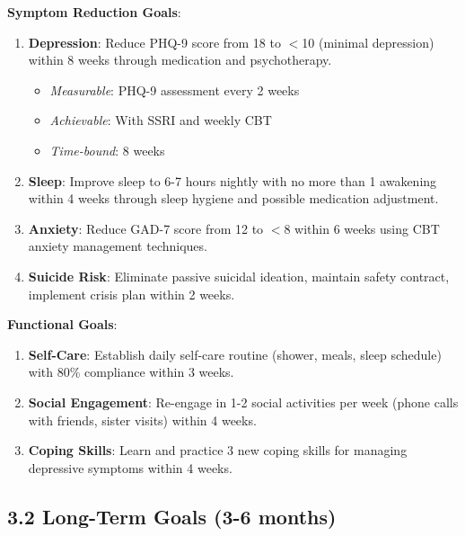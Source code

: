\documentclass[11pt,letterpaper]{article}
\begin{document}
\textbf{Symptom Reduction Goals}:
\begin{enumerate}[leftmargin=*]
    \item \textbf{Depression}: Reduce PHQ-9 score from 18 to $<$10 (minimal depression) within 8 weeks through medication and psychotherapy.
    \begin{itemize}
        \item \textit{Measurable}: PHQ-9 assessment every 2 weeks
        \item \textit{Achievable}: With SSRI and weekly CBT
        \item \textit{Time-bound}: 8 weeks
    \end{itemize}
    
    \item \textbf{Sleep}: Improve sleep to 6-7 hours nightly with no more than 1 awakening within 4 weeks through sleep hygiene and possible medication adjustment.
    
    \item \textbf{Anxiety}: Reduce GAD-7 score from 12 to $<$8 within 6 weeks using CBT anxiety management techniques.
    
    \item \textbf{Suicide Risk}: Eliminate passive suicidal ideation, maintain safety contract, implement crisis plan within 2 weeks.
\end{enumerate}

\textbf{Functional Goals}:
\begin{enumerate}[leftmargin=*]
    \item \textbf{Self-Care}: Establish daily self-care routine (shower, meals, sleep schedule) with 80\% compliance within 3 weeks.
    
    \item \textbf{Social Engagement}: Re-engage in 1-2 social activities per week (phone calls with friends, sister visits) within 4 weeks.
    
    \item \textbf{Coping Skills}: Learn and practice 3 new coping skills for managing depressive symptoms within 4 weeks.
\end{enumerate}

\subsection*{3.2 Long-Term Goals (3-6 months)}
\end{document}
